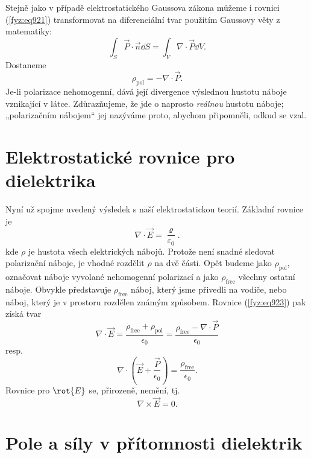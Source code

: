     Stejně jako v případě elektrostatického Gaussova zákona můžeme i rovnici (\ref{fyz:eq921})
    transformovat na diferenciální tvar použitím Gaussovy věty z matematiky:
    \begin{equation*}
      \int_S\vec{P}\cdot\vec{n}\dd{S}=\int_V∇\cdot\vec{P}\dd{V}.
    \end{equation*}
    Dostaneme
    \begin{equation}\label{fyz:eq922}
      ρ_{\text{pol}}=−∇⋅\vec{P}.
    \end{equation}
    Je-li polarizace nehomogenní, dává její divergence výslednou hustotu náboje vznikající v látce.
    Zdůrazňujeme, že jde o naprosto \emph{reálnou} hustotu náboje; „polarizačním nábojem“ jej
    nazýváme proto, abychom připomněli, odkud se vzal.

  \section{Elektrostatické rovnice pro dielektrika}\label{fyz:IIchapXsecIV}
    Nyní už spojme uvedený výsledek s naší elektrostatickou teorií. Základní rovnice je
    \begin{equation}\label{fyz:eq923}
      ∇\cdot\vec{E}=\dfrac{\varrho}{\varepsilon_0}.
    \end{equation}
    kde \(ρ\) je hustota všech elektrických nábojů. Protože není snadné sledovat polarizační náboje,
    je vhodné rozdělit \(ρ\) na dvě části. Opět budeme jako \(ρ_{\text{pol}}\), označovat náboje
    vyvolané nehomogenní polarizací a jako \(ρ_{\text{free}}\) všechny ostatní náboje. Obvykle
    představuje \(ρ_{\text{free}}\) náboj, který jsme přivedli na vodiče, nebo náboj, který je v
    prostoru rozdělen známým způsobem. Rovnice (\ref{fyz:eq923}) pak získá tvar
    \begin{equation*}
      ∇⋅\vec{E}=\dfrac{ρ_{\text{free}}+ρ_{\text{pol}}}{ϵ_0}=\dfrac{ρ_{\text{free}}−∇⋅\vec{P}}{ϵ_0}
    \end{equation*}
    resp. 
    \begin{equation}\label{fyz:eq923}
      ∇\cdot\left(\vec{E}+\dfrac{\vec{P}}{ϵ_0}\right)=\dfrac{ρ_{\text{free}}}{ϵ_0}.
    \end{equation}
    Rovnice pro \(\rot{E}\) se, přirozeně, nemění, tj.
    \begin{equation}\label{fyz:eq924}
      ∇×\vec{E}=0.
    \end{equation}

    \section{Pole a síly v přítomnosti dielektrik}\label{fyz:IIchapXsecV}

